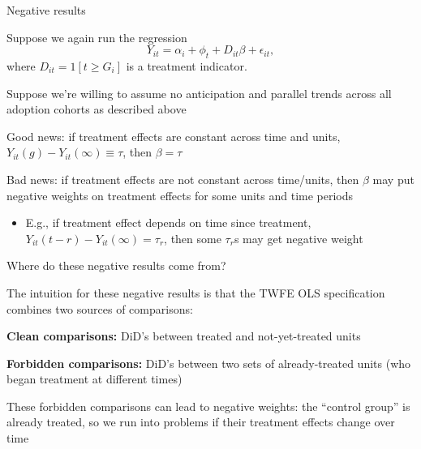 \documentclass[aspectratio = 169, 13pt]{beamer}
\begin{document}
\begin{frame}{Negative results}
  \begin{wideitemize}
    \item
    Suppose we again run the regression
    \vspace{-3mm}
    $$Y_{it} = \alpha_i + \phi_t + D_{it} \beta  + \epsilon_{it}, $$
    \noindent where $D_{it} = 1[t \geq G_i]$ is a treatment indicator. 
    
    \item
    Suppose we're willing to assume no anticipation and  parallel trends across all adoption cohorts as described above

    \pause
    \vspace{-3mm}
    \item
    Good news: if treatment effects are constant across time and units, $Y_{it}(g) - Y_{it}(\infty) \equiv \tau$, then $\beta = \tau$

    \pause
    \vspace{-3mm}
    \item
    Bad news: if treatment effects are not constant across time/units, then $\beta$ may put negative weights on treatment effects for some units and time periods
    \begin{itemize}
      \item
            E.g., if treatment effect depends on time since treatment, $Y_{it}(t-r) - Y_{it}(\infty) = \tau_{r}$, then some $\tau_r$s may get negative weight
    \end{itemize}
  \end{wideitemize}
\end{frame}

\begin{frame}{Where do these negative results come from?}
  \begin{wideitemize}
    \item
    The intuition for these negative results is that the TWFE OLS specification combines two sources of comparisons:

    \medskip

    \begin{enumerate}
      {\normalsize
      \item
            \textbf{Clean comparisons:} DiD's between treated and not-yet-treated units

            \medskip

      \item
            \textbf{Forbidden comparisons:} DiD's between two sets of already-treated units (who began treatment at different times)
            }
    \end{enumerate}

    \item
    These forbidden comparisons can lead to negative weights: the ``control group'' is already treated, so we run into problems if their treatment effects change over time
  \end{wideitemize}
\end{frame}
\end{document}
